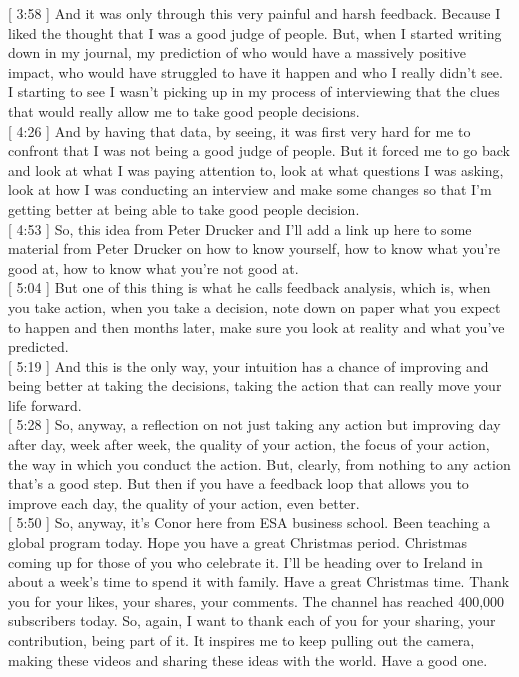 \documentclass[a4paper,12pt]{article}
\begin{document}
[ 3:58 ] And it was only through this very painful and harsh feedback. Because I liked the thought that I was a good judge of people. But, when I started writing down in my journal, my prediction of who would have a massively positive impact, who would have struggled to have it happen and who I really didn't see. I starting to see I wasn't picking up in my process of interviewing that the clues that would really allow me to take good people decisions. \\

[ 4:26 ] And by having that data, by seeing, it was first very hard for me to confront that I was not being a good judge of people. But it forced me to go back and look at what I was paying attention to, look at what questions I was asking, look at how I was conducting an interview and make some changes so that I'm getting better at being able to take good people decision. \\

[ 4:53 ] So, this idea from Peter Drucker and I'll add a link up here to some material from Peter Drucker on how to know yourself, how to know what you're good at, how to know what you're not good at. \\

[ 5:04 ] But one of this thing is what he calls feedback analysis, which is, when you take action, when you take a decision, note down on paper what you expect to happen and then months later, make sure you look at reality and what you've predicted. \\

[ 5:19 ] And this is the only way, your intuition has a chance of improving and being better at taking the decisions, taking the action that can really move your life forward. \\

[ 5:28 ] So, anyway, a reflection on not just taking any action but improving day after day, week after week, the quality of your action, the focus of your action, the way in which you conduct the action. But, clearly, from nothing to any action that's a good step. But then if you have a feedback loop that allows you to improve each day, the quality of your action, even better. \\

[ 5:50 ] So, anyway, it's Conor here from ESA business school. Been teaching a global program today. Hope you have a great Christmas period. Christmas coming up for those of you who celebrate it. I'll be heading over to Ireland in about a week's time to spend it with family. Have a great Christmas time. Thank you for your likes, your shares, your comments. The channel has reached 400,000 subscribers today. So, again, I want to thank each of you for your sharing, your contribution, being part of it. It inspires me to keep pulling out the camera, making these videos and sharing these ideas with the world. Have a good one. \\
\end{document}

